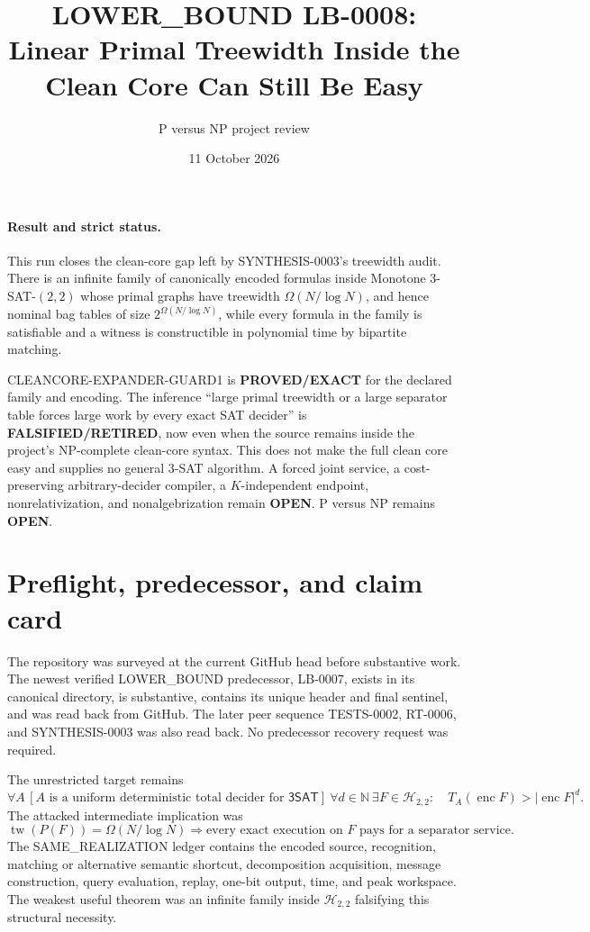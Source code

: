 \documentclass[11pt]{article}
\title{LOWER\_BOUND LB-0008:\\
Linear Primal Treewidth Inside the Clean Core Can Still Be Easy}
\author{P versus NP project review}
\date{11 October 2026}
\newcommand{\SAT}{\mathsf{3SAT}}
\newcommand{\tw}{\operatorname{tw}}
\newcommand{\status}[1]{\textbf{#1}}
\begin{document}
\maketitle

\paragraph{Result and strict status.}
This run closes the clean-core gap left by SYNTHESIS-0003's treewidth audit.
There is an infinite family of canonically encoded formulas inside Monotone
$3$-SAT-$(2,2)$ whose primal graphs have treewidth
\(\Omega(N/\log N)\), and hence nominal bag tables of size
\(2^{\Omega(N/\log N)}\), while every formula in the family is satisfiable
and a witness is constructible in polynomial time by bipartite matching.

\textsf{CLEANCORE-EXPANDER-GUARD1} is \status{PROVED/EXACT} for the declared
family and encoding.  The inference ``large primal treewidth or a large
separator table forces large work by every exact SAT decider'' is
\status{FALSIFIED/RETIRED}, now even when the source remains inside the
project's NP-complete clean-core syntax.  This does not make the full clean
core easy and supplies no general 3-SAT algorithm.  A forced joint service,
a cost-preserving arbitrary-decider compiler, a $K$-independent endpoint,
nonrelativization, and nonalgebrization remain \status{OPEN}.  P versus NP
remains \status{OPEN}.

\section{Preflight, predecessor, and claim card}
The repository was surveyed at the current GitHub head before substantive
work.  The newest verified LOWER\_BOUND predecessor, LB-0007, exists in its
canonical directory, is substantive, contains its unique header and final
sentinel, and was read back from GitHub.  The later peer sequence
TESTS-0002, RT-0006, and SYNTHESIS-0003 was also read back.  No predecessor
recovery request was required.

The unrestricted target remains
\[
 \tag{UCORE-TIME1}
 \forall A\,[A\text{ is a uniform deterministic total decider for }\SAT]
 \ \forall d\in\mathbb N\ \exists F\in\mathcal H_{2,2}:\quad
 T_A(\operatorname{enc}F)>|\operatorname{enc}F|^d.
\]
The attacked intermediate implication was
\[
 \tag{TW-MESSAGE-NECESSITY}
 \tw(P(F))=\Omega(N/\log N)
 \Longrightarrow
 \text{every exact execution on }F\text{ pays for a separator service}.
\]
The SAME\_REALIZATION ledger contains the encoded source, recognition,
matching or alternative semantic shortcut, decomposition acquisition,
message construction, query evaluation, replay, one-bit output, time, and
peak workspace.  The weakest useful theorem was an infinite family inside
\(\mathcal H_{2,2}\) falsifying this structural necessity.
\end{document}
